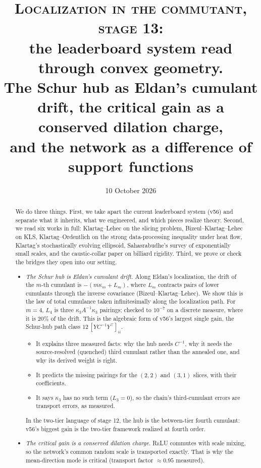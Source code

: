 \documentclass[11pt]{article}
\title{\textsc{Localization in the commutant, stage 13:}\\ \large the leaderboard system read through convex geometry.\\
The Schur hub as Eldan's cumulant drift, the critical gain as a conserved dilation charge,\\ and the network as a difference of
support functions}
\author{}
\date{10 October 2026}
\theoremstyle{plain}
\theoremstyle{definition}\newtheorem{definition}[theorem]{Definition}\newtheorem{remark}[theorem]{Remark}
\begin{document}
\maketitle
\begin{abstract}
We do three things. First, we take apart the current leaderboard system (v56) and separate what it inherits, what we engineered,
and which pieces realize theory. Second, we read six works in full: Klartag--Lehec on the slicing problem, Bizeul--Klartag--Lehec on
KLS, Klartag--Ordentlich on the strong data-processing inequality under heat flow, Klartag's stochastically evolving ellipsoid,
Sahasrabudhe's survey of exponentially small scales, and the caustic-collar paper on billiard rigidity. Third, we prove or check
the bridges they open into our setting.
\begin{itemize}[leftmargin=*]
\item \emph{The Schur hub is Eldan's cumulant drift.} Along Eldan's localization, the drift of the $m$-th cumulant is
$-(m\kappa_m+L_m)$, where $L_m$ contracts pairs of lower cumulants through the inverse covariance (Bizeul--Klartag--Lehec).
We show this is the law of total cumulance taken infinitesimally along the localization path. For $m=4$, $L_4$ is three
$\kappa_3A^{-1}\kappa_3$ pairings; checked to $10^{-7}$ on a discrete measure, where it is $20\%$ of the drift. This is the
algebraic form of v56's largest single gain, the Schur-hub path class $12\,[YC^{-1}Y^\top]_{ii}$.
\begin{itemize}
\item It explains three measured facts: why the hub needs $C^{-1}$, why it needs the source-resolved (quenched) third
cumulant rather than the annealed one, and why its derived weight is right.
\item It predicts the missing pairings for the $(2,2)$ and $(3,1)$ slices, with their coefficients.
\item It says $\kappa_3$ has no such term ($L_3=0$), so the chain's third-cumulant errors are transport errors, as measured.
\end{itemize}
In the two-tier language of stage 12, the hub is the between-tier fourth cumulant: v56's biggest gain is the two-tier
framework realized at fourth order.
\item \emph{The critical gain is a conserved dilation charge.} \textsc{ReLU} commutes with scale mixing, so the network's common
random scale is transported exactly. That is why the mean-direction mode is critical (transport factor $\approx0.95$ measured).
\begin{itemize}

\end{itemize}
\end{itemize}
\end{abstract}
\end{document}
